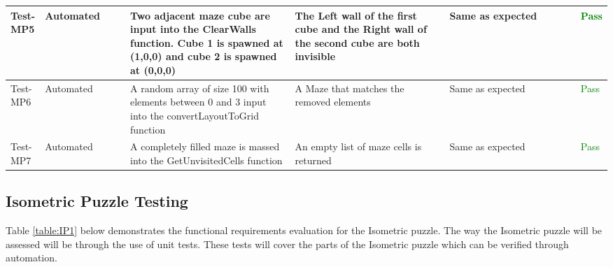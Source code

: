\documentclass[12pt, titlepage]{article}
\begin{document}
\begin{table}[H]
{\begin{tabular}{|l|p{0.15\linewidth}|p{0.3\linewidth}|p{0.3\linewidth}|p{0.3\linewidth}|p{0.1\linewidth}|}
\hline
Test-MP5 & Automated &  Two adjacent maze cube are input into the ClearWalls function. Cube 1 is spawned at (1,0,0) and cube 2 is spawned at (0,0,0)  & The Left wall of the first cube and the Right wall of the second cube are both invisible & Same as expected & \textcolor{Green}{Pass} \\
\hline
Test-MP6 & Automated & A random array of size 100 with elements between 0 and 3 input into the convertLayoutToGrid function  & A Maze that matches the removed elements & Same as expected & \textcolor{Green}{Pass} \\
\hline
Test-MP7 & Automated & A completely filled maze is massed into the GetUnvisitedCells function  & An empty list of maze cells is returned & Same as expected & \textcolor{Green}{Pass} \\
\hline
\end{tabular}}
\label{table:MP1}
\end{table}

\subsection{Isometric Puzzle Testing}
Table \ref{table:IP1} below demonstrates the functional requirements evaluation for the Isometric puzzle. The way the Isometric puzzle will be assessed will be through the use of unit tests. These tests will cover the parts of the Isometric puzzle which can be verified through automation.
\begin{table}[H]
\caption{\bf Isometric Puzzle Evaluation Results}
\label{table:IP1}
\end{table}
\end{document}
